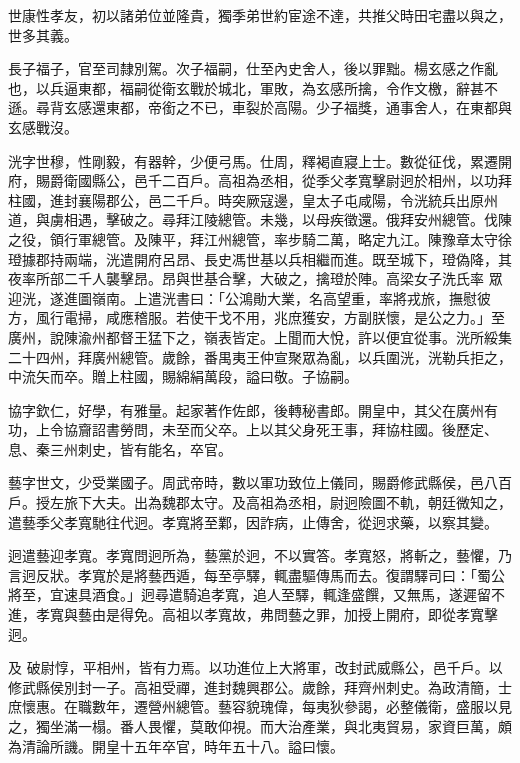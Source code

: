 \begin{pinyinscope}
 世康性孝友，初以諸弟位並隆貴，獨季弟世約宦途不達，共推父時田宅盡以與之，世多其義。



 長子福子，官至司隸別駕。次子福嗣，仕至內史舍人，後以罪黜。楊玄感之作亂也，以兵逼東都，福嗣從衛玄戰於城北，軍敗，為玄感所擒，令作文檄，辭甚不遜。尋背玄感還東都，帝銜之不已，車裂於高陽。少子福獎，通事舍人，在東都與玄感戰沒。



 洸字世穆，性剛毅，有器幹，少便弓馬。仕周，釋褐直寢上士。數從征伐，累遷開府，賜爵衛國縣公，邑千二百戶。高祖為丞相，從季父孝寬擊尉迥於相州，以功拜柱國，進封襄陽郡公，邑二千戶。時突厥寇邊，皇太子屯咸陽，令洸統兵出原州道，與虜相遇，擊破之。尋拜江陵總管。未幾，以母疾徵還。俄拜安州總管。伐陳之役，領行軍總管。及陳平，拜江州總管，率步騎二萬，略定九江。陳豫章太守徐璒據郡持兩端，洸遣開府呂昂、長史馮世基以兵相繼而進。既至城下，璒偽降，其夜率所部二千人襲擊昂。昂與世基合擊，大破之，擒璒於陣。高梁女子洗氏率
 眾迎洸，遂進圖嶺南。上遣洸書曰：「公鴻勛大業，名高望重，率將戎旅，撫慰彼方，風行電掃，咸應稽服。若使干戈不用，兆庶獲安，方副朕懷，是公之力。」至廣州，說陳渝州都督王猛下之，嶺表皆定。上聞而大悅，許以便宜從事。洸所綏集二十四州，拜廣州總管。歲餘，番禺夷王仲宣聚眾為亂，以兵圍洸，洸勒兵拒之，中流矢而卒。贈上柱國，賜綿絹萬段，謚曰敬。子協嗣。



 協字欽仁，好學，有雅量。起家著作佐郎，後轉秘書郎。開皇中，其父在廣州有功，上令協齎詔書勞問，未至而父卒。上以其父身死王事，拜協柱國。後歷定、息、秦三州刺史，皆有能名，卒官。



 藝字世文，少受業國子。周武帝時，數以軍功致位上儀同，賜爵修武縣侯，邑八百戶。授左旅下大夫。出為魏郡太守。及高祖為丞相，尉迥險圖不軌，朝廷微知之，遣藝季父孝寬馳往代迥。孝寬將至鄴，因詐病，止傳舍，從迥求藥，以察其變。



 迥遣藝迎孝寬。孝寬問迥所為，藝黨於迥，不以實答。孝寬怒，將斬之，藝懼，乃言迥反狀。孝寬於是將藝西遁，每至亭驛，輒盡驅傳馬而去。復謂驛司曰：「蜀公將至，宜速具酒食。」迥尋遣騎追孝寬，追人至驛，輒逢盛饌，又無馬，遂遲留不進，孝寬與藝由是得免。高祖以孝寬故，弗問藝之罪，加授上開府，即從孝寬擊迥。



 及
 破尉惇，平相州，皆有力焉。以功進位上大將軍，改封武威縣公，邑千戶。以修武縣侯別封一子。高祖受禪，進封魏興郡公。歲餘，拜齊州刺史。為政清簡，士庶懷惠。在職數年，遷營州總管。藝容貌瑰偉，每夷狄參謁，必整儀衛，盛服以見之，獨坐滿一榻。番人畏懼，莫敢仰視。而大治產業，與北夷貿易，家資巨萬，頗為清論所譏。開皇十五年卒官，時年五十八。謚曰懷。




\end{pinyinscope}
